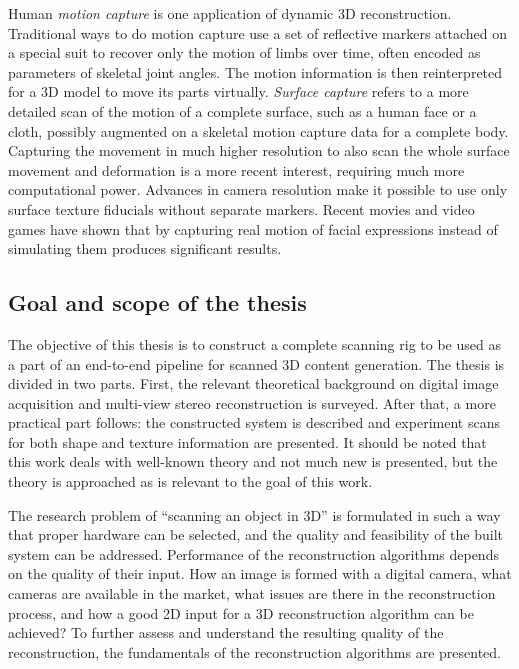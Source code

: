 
Human \emph{motion capture} is one application of dynamic 3D reconstruction.
Traditional ways to do motion capture use a set of reflective markers attached on a special suit to recover only the motion of limbs over time, often encoded as parameters of skeletal joint angles.
The motion information is then reinterpreted for a 3D model to move its parts virtually.
\emph{Surface capture} refers to a more detailed scan of the motion of a complete surface, such as a human face or a cloth, possibly augmented on a skeletal motion capture data for a complete body.
Capturing the movement in much higher resolution to also scan the whole surface movement and deformation is a more recent interest, requiring much more computational power.
Advances in camera resolution make it possible to use only surface texture fiducials without separate markers.
Recent movies and video games have shown that by capturing real motion of facial expressions instead of simulating them produces significant results.


\subsection{Goal and scope of the thesis}

The objective of this thesis is to construct a complete scanning rig to be used as a part of an end-to-end pipeline for scanned 3D content generation.
The thesis is divided in two parts.
First, the relevant theoretical background on digital image acquisition and multi-view stereo reconstruction is surveyed.
After that, a more practical part follows: the constructed system is described and experiment scans for both shape and texture information are presented.
It should be noted that this work deals with well-known theory and not much new is presented, but the theory is approached as is relevant to the goal of this work.

The research problem of ``scanning an object in 3D'' is formulated in such a way that proper hardware can be selected, and the quality and feasibility of the built system can be addressed.
Performance of the reconstruction algorithms depends on the quality of their input.
How an image is formed with a digital camera, what cameras are available in the market, what issues are there in the reconstruction process, and how a good 2D input for a 3D reconstruction algorithm can be achieved?
To further assess and understand the resulting quality of the reconstruction, the fundamentals of the reconstruction algorithms are presented.

